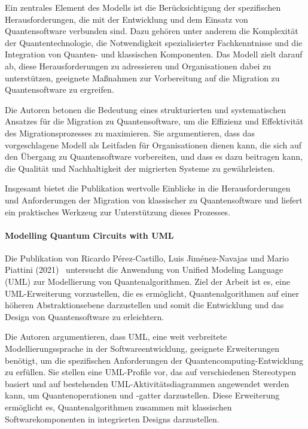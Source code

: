 Ein zentrales Element des Modells ist die Berücksichtigung der spezifischen Herausforderungen, die mit der 
Entwicklung und dem Einsatz von Quantensoftware verbunden sind. Dazu gehören unter anderem die Komplexität der 
Quantentechnologie, die Notwendigkeit spezialisierter Fachkenntnisse und die Integration von Quanten- und 
klassischen Komponenten. Das Modell zielt darauf ab, diese Herausforderungen zu adressieren und Organisationen 
dabei zu unterstützen, geeignete Maßnahmen zur Vorbereitung auf die Migration zu Quantensoftware zu ergreifen.

Die Autoren betonen die Bedeutung eines strukturierten und systematischen Ansatzes für die Migration zu 
Quantensoftware, um die Effizienz und Effektivität des Migrationsprozesses zu maximieren. Sie argumentieren, dass 
das vorgeschlagene Modell als Leitfaden für Organisationen dienen kann, die sich auf den Übergang zu 
Quantensoftware vorbereiten, und dass es dazu beitragen kann, die Qualität und Nachhaltigkeit der 
migrierten Systeme zu gewährleisten.

Insgesamt bietet die Publikation wertvolle Einblicke in die Herausforderungen und Anforderungen der Migration 
von klassischer zu Quantensoftware und liefert ein praktisches Werkzeug zur Unterstützung dieses Prozesses.

\paragraph{Modelling Quantum Circuits with UML}

Die Publikation von Ricardo Pérez-Castillo, Luis Jiménez-Navajas und Mario Piattini (2021)~\cite{Perez-Castillo_2021} untersucht die Anwendung 
von Unified Modeling Language (UML) zur Modellierung von Quantenalgorithmen. Ziel der Arbeit ist es, eine 
UML-Erweiterung vorzustellen, die es ermöglicht, Quantenalgorithmen auf einer höheren Abstraktionsebene 
darzustellen und somit die Entwicklung und das Design von Quantensoftware zu erleichtern.

Die Autoren argumentieren, dass UML, eine weit verbreitete Modellierungssprache in der Softwareentwicklung, 
geeignete Erweiterungen benötigt, um die spezifischen Anforderungen der Quantencomputing-Entwicklung zu erfüllen. 
Sie stellen eine UML-Profile vor, das auf verschiedenen Stereotypen basiert und auf bestehenden UML-Aktivitätsdiagrammen 
angewendet werden kann, um Quantenoperationen und -gatter darzustellen. Diese Erweiterung ermöglicht es, 
Quantenalgorithmen zusammen mit klassischen Softwarekomponenten in integrierten Designs darzustellen.


